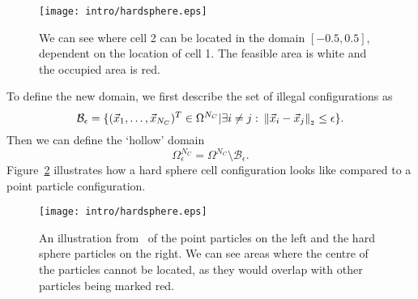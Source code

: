 \begin{figure}[h!]
	\centering
	\texttt{[image: intro/hardsphere.eps]}
	\caption{We can see where cell 2 can be located in the domain $[-0.5, 0.5]$, dependent on the location of cell 1. 
	The feasible area is white and the occupied area is red.  %
	}
	\label{fig:exclusion1d}
\end{figure}

To define the new domain, we first describe the set of illegal configurations as
\[
	\mathcal{B}_{\epsilon} = \{(\vec{x}_1, \ldots, \vec{x}_{N_C})^T \in \Omega^{N_C} | \exists i \neq j: \: \norm[\vec{x}_i - \vec{x}_j] \leq \epsilon\}.
\]
Then we can define the `hollow' domain 
\[
	\Omega_{\epsilon}^{N_C} = \Omega^{N_C} \setminus \mathcal{B}_{\epsilon}.
\]
Figure~\ref{fig:hardsphere} illustrates how a hard sphere cell configuration looks like compared to a point particle configuration. \\



\begin{figure}[h!]
	\centering
	\texttt{[image: intro/hardsphere.eps]}
	\caption{An illustration from~\cite{Bruna2012} of the point particles on the left and the hard sphere particles on the right. We can see areas where the centre of the particles cannot be located, as they would overlap with other particles being marked red. 
	}
	\label{fig:hardsphere}
\end{figure}


